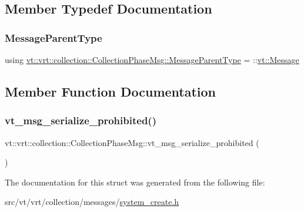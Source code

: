 \subsection{Member Typedef Documentation}
\mbox{\label{structvt_1_1vrt_1_1collection_1_1_collection_phase_msg_ae3c11bee048cf35f11453a798269df6a}} 
\subsubsection{\texorpdfstring{Message\+Parent\+Type}{MessageParentType}}
{\footnotesize\ttfamily using \hyperlink{structvt_1_1vrt_1_1collection_1_1_collection_phase_msg_ae3c11bee048cf35f11453a798269df6a}{vt\+::vrt\+::collection\+::\+Collection\+Phase\+Msg\+::\+Message\+Parent\+Type} =  \+::\hyperlink{namespacevt_a3a3ddfef40b4c90915fa43cdd5f129ea}{vt\+::\+Message}}



\subsection{Member Function Documentation}
\mbox{\label{structvt_1_1vrt_1_1collection_1_1_collection_phase_msg_a34b0d7bb42a203ca9b364761c8d860e6}} 
\subsubsection{\texorpdfstring{vt\+\_\+msg\+\_\+serialize\+\_\+prohibited()}{vt\_msg\_serialize\_prohibited()}}
{\footnotesize\ttfamily vt\+::vrt\+::collection\+::\+Collection\+Phase\+Msg\+::vt\+\_\+msg\+\_\+serialize\+\_\+prohibited (\begin{DoxyParamCaption}{ }\end{DoxyParamCaption})}



The documentation for this struct was generated from the following file\+:\begin{DoxyCompactItemize}
\item 
src/vt/vrt/collection/messages/\hyperlink{system__create_8h}{system\+\_\+create.\+h}\end{DoxyCompactItemize}
